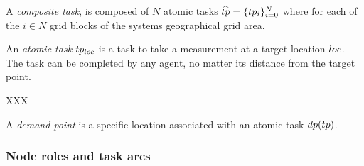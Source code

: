 \begin{definition}
	A \textit{composite task}, is composed of $N$ atomic tasks $\varCompositeTask{}{} = \lbrace \varAtomicTask{i}{} \rbrace_{i=0}^N$ where for each of the $i\in N$ grid blocks of the systems geographical grid area.
\end{definition}

\begin{definition}
	An \textit{atomic task} $\varAtomicTask{\varLocation{}{}}{}$ is a task to take a measurement at a target location $\varLocation{}{}$. The task can be completed by any agent, no matter its distance from the target point.
\end{definition}

\newcommand{\functionTaskResourceAllocation}[2]{
	\functionSignature{ra_{\varAgent{}{}}}
	{\varAtomicTask{}{}}
}
\begin{definition}
	XXX
\end{definition}


\begin{definition}
	A \textit{demand point} is a specific location associated with an atomic task $\functionTaskDemandPoint{}{}$.
\end{definition}


\subsubsection*{Node roles and task arcs}
\newcommand{\formalSinkRole}[2]{
	\functionFormal{sink}
	{\setAtomicTask{}{} \times \setAgents{}{}}
	{\powerSetAgents{}{}}
}
\newcommand{\formalSenseRole}[2]{
	\functionFormal{sense}
	{\setAtomicTask{}{} \times \setAgents{}{}}
	{\powerSetAgents{}{}}
}
\newcommand{\formalActiveRole}[2]{
	\functionFormal{active}
	{\setAtomicTask{}{} \times \setAgents{}{}}
	{\powerSetAgents{}{}}
}
\newcommand{\formalIdleRole}[2]{
	\functionFormal{idle_{\setTime{}{}}}
	{\setAgents{}{}}
	{\setAgents{}{}}
}
\newcommand{\formalSleepRole}[2]{
	\functionFormal{sink_{\setTime{}{}}}
	{\setAgents{}{}}
	{\setAgents{}{}}
}
\newcommand{\functionSinkRole}[2]{\functionSignature{sink}{\varAtomicTask{}{}, \setAgents{}{}}}
	
\newcommand{\functionSenseRole}[2]{\functionSignature{sense}{\varAtomicTask{}{}, \setAgents{}{}}}
\newcommand{\functionActiveRole}[2]{\functionSignature{active}{\varAtomicTask{}{}, \setAgents{}{}}}
\newcommand{\functionIdleRole}[2]{\functionSignature{idle}{\varAtomicTask{}{}, \setAgents{}{}}}
\newcommand{\functionSleepRole}[2]{\functionSignature{sleep}{\varAtomicTask{}{}, \setAgents{}{}}}


